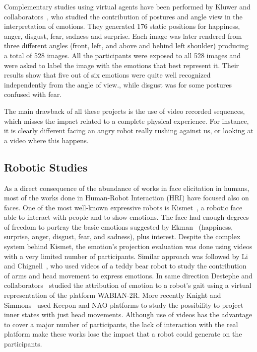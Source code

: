 Complementary studies using virtual agents have been performed by  Kluwer and collaborators~\cite{Kluwer2004}, who studied the contribution of postures and angle view in the interpretation of emotions. They generated 176 static positions for happiness, anger, disgust, fear, sadness and surprise. Each image was later rendered from three different angles (front, left, and above and behind left shoulder) producing a total of 528 images. All the participants were exposed to all 528 images and were asked to label the image with the emotions that best represent it. Their results show that five out of six emotions were quite well recognized independently from the angle of view., while disgust was for some postures confused with fear.

The main drawback of all these projects is the use of video recorded sequences, which misses the impact related to a complete physical experience. For instance, it is clearly different facing an angry robot really rushing against us, or looking at a video where this happens.

\subsection{Robotic Studies}

As a direct consequence of the abundance of works in face elicitation in humans, most of the works done in Human-Robot Interaction (HRI) have focused also on faces. One of the most well-known expressive robots is Kismet~\cite{Breazeal2002}, a robotic face able to interact with people and to show emotions. The face had enough degrees of freedom to portray the basic emotions suggested by Ekman~\cite{Ekman2004} (happiness, surprise, anger, disgust, fear, and sadness), plus interest. 
Despite the complex system behind Kismet, the emotion's projection evaluation was done using videos with a very limited number of participants. Similar approach was followed by Li and Chignell~\cite{Li2011}, who used videos of a teddy bear robot to study the contribution of arms and head movement to express emotions. In same direction Destephe and collaborators~\cite{Destephe2013b,Destephe2013} studied the attribution of emotion to a robot's gait using a virtual representation of the platform WABIAN-2R. More recently Knight and Simmons~\cite{knight2016} used Keepon and NAO platforms to study the possibility to project inner states with just head movements. Although use of videos has the advantage to cover a major number of participants, the lack of interaction with the real platform make these works lose the impact that a robot could generate on the participants.  

